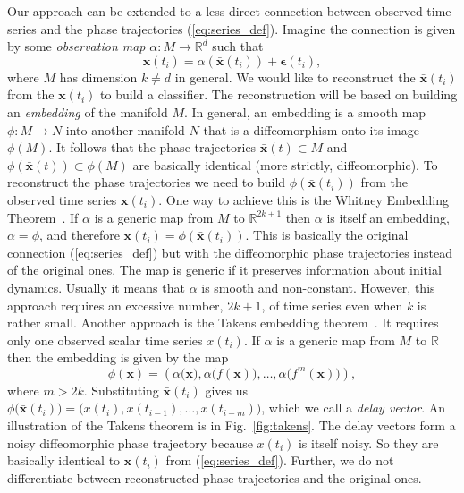 \documentclass[referee, pdflatex, sn-mathphys-num]{sn-jnl}
\theoremstyle{definition}
\theoremstyle{plain}
\newcommand{\bx}{\ensuremath{\mathbf{x}}}
\newcommand{\bbx}{\ensuremath{\bar{\mathbf{x}}}}
\newcommand{\beps}{\ensuremath{\boldsymbol{\epsilon}}}
\begin{document}
	Our approach can be extended to a less direct connection between observed time series and the phase trajectories (\ref{eq:series_def}). Imagine the connection is given by some \emph{observation map} $\alpha: M \to \mathbb{R}^d$ such that
	\begin{equation}\label{eq:takens_series}
		\bx(t_i) = \alpha(\bbx(t_i)) + \beps(t_i),
	\end{equation}
	where $M$ has dimension $k \not= d$ in general. We would like to reconstruct the $\bbx(t_i)$ from the $\bx(t_i)$ to build a classifier. The reconstruction will be based on building an \emph{embedding} of the manifold $M$. In general, an embedding is a smooth map $\phi: M \to N$ into another manifold $N$ that is a diffeomorphism onto its image $\phi(M)$. It follows that the phase trajectories $\bbx(t) \subset M$ and $\phi(\bbx(t)) \subset\phi(M)$ are basically identical (more strictly, diffeomorphic). To reconstruct the phase trajectories we need to build $\phi(\bbx(t_i))$ from the observed time series $\bx(t_i)$. One way to achieve this is the Whitney Embedding Theorem~\cite{whitney}. If $\alpha$ is a generic map from $M$ to $\mathbb{R}^{2k + 1}$ then $\alpha$ is itself an embedding, $\alpha = \phi$, and therefore $\bx(t_i) = \phi(\bbx(t_i))$. This is basically the original connection (\ref{eq:series_def}) but with the diffeomorphic phase trajectories instead of the original ones. The map is generic if it preserves information about initial dynamics. Usually it means that $\alpha$ is smooth and non-constant. However, this approach requires an excessive number, $2k + 1$, of time series even when $k$ is rather small. Another approach is the Takens embedding theorem~\cite{takens2006detecting}. It requires only one observed scalar time series $x(t_i)$. If $\alpha$ is a generic map from $M$ to $\mathbb{R}$ then the embedding is given by the map
	\begin{equation*}
		\phi(\bbx) = ( \alpha \big(\bbx \big), \alpha \big( f(\bbx) \big), \ldots, \alpha \big( f^m(\bbx) \big) ),
	\end{equation*}
	where $m > 2k$. Substituting $\bbx(t_i)$ gives us $\phi \big( \bbx(t_i) \big) = \big( x(t_i), x(t_{i-1}), \ldots, x(t_{i-m})\big)$, which we call a \emph{delay vector}. An illustration of the Takens theorem is in Fig.~\ref{fig:takens}. The delay vectors form a noisy diffeomorphic phase trajectory because $x(t_i)$ is itself noisy. So they are basically identical to $\bx(t_i)$ from (\ref{eq:series_def}). Further, we do not differentiate between reconstructed phase trajectories and the original ones.
	
\end{document}
